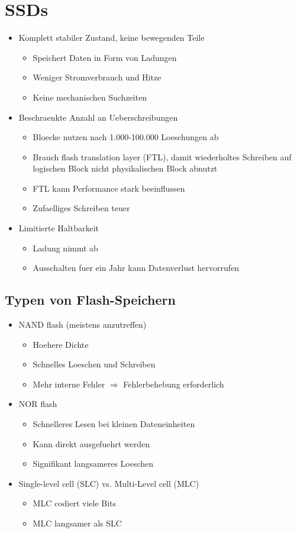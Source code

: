\documentclass[a4paper]{scrreprt}
\begin{document}
\section{SSDs}
\begin{itemize}
	\item Komplett stabiler Zustand, keine bewegenden Teile
		\begin{itemize}
			\item Speichert Daten in Form von Ladungen
			\item Weniger Stromverbrauch und Hitze
			\item Keine mechanischen Suchzeiten
		\end{itemize}
	\item Beschraenkte Anzahl an Ueberschreibungen
		\begin{itemize}
			\item Bloecke nutzen nach 1.000-100.000 Loeschungen ab
			\item Brauch flash translation layer (FTL), damit wiederholtes Schreiben auf logischen Block nicht physikalischen Block abnutzt
			\item FTL kann Performance stark beeinflussen
			\item Zufaelliges Schreiben teuer
		\end{itemize}
	\item Limitierte Haltbarkeit
		\begin{itemize}
			\item Ladung nimmt ab
			\item Ausschalten fuer ein Jahr kann Datenverlust hervorrufen
		\end{itemize}
\end{itemize}

\subsection{Typen von Flash-Speichern}
\begin{itemize}
	\item NAND flash (meistens anzutreffen)
		\begin{itemize}
			\item Hoehere Dichte
			\item Schnelles Loeschen und Schreiben
			\item Mehr interne Fehler $\Rightarrow$ Fehlerbehebung erforderlich
		\end{itemize}
	\item NOR flash
		\begin{itemize}
			\item Schnelleres Lesen bei kleinen Dateneinheiten
			\item Kann direkt ausgefuehrt werden
			\item Signifikant langsameres Loeschen
		\end{itemize}
	\item Single-level cell (SLC) vs. Multi-Level cell (MLC)
		\begin{itemize}
			\item MLC codiert viele Bits
			\item MLC langsamer als SLC
		\end{itemize}
\end{itemize}
\end{document}
